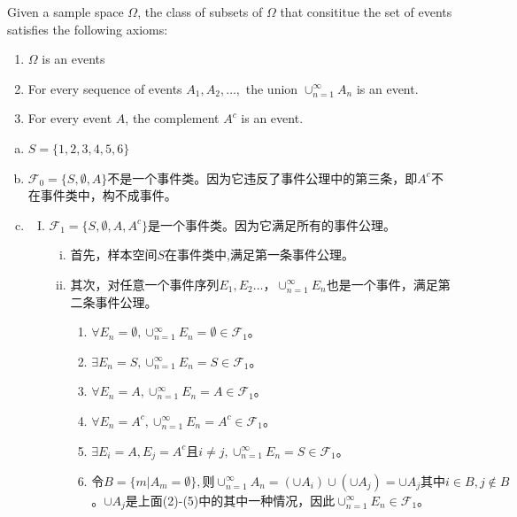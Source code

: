 \documentclass[UTF8]{article}
\begin{document}
Given a sample space $\Omega$, the class of subsets of $\Omega$ that consititue the set of events satisfies the following axioms:
\begin{enumerate}
    \item $\Omega$ is an events
    \item For every sequence of events $A_1,A_2,\dots,$ the union $\cup^\infty_{n=1}A_n$ is an event.
    \item For every event $A$, the complement $A^c$ is an event.
\end{enumerate}
\begin{enumerate}[a)]
    \item $S=\{1, 2, 3, 4, 5, 6\}$
    \item $\mathcal{F}_0=\{S,\emptyset,A\}$不是一个事件类。因为它违反了事件公理中的第三条，即$A^c$不在事件类中，构不成事件。
    \item   \begin{enumerate}[I.]
                \item $\mathcal{F}_1=\{S,\emptyset, A, A^c\}$是一个事件类。因为它满足所有的事件公理。
                \begin{enumerate}[i.]
                    \item 首先，样本空间$S$在事件类中,满足第一条事件公理。
                    \item 其次，对任意一个事件序列$E_1,E_2\dots$，$\cup^\infty_{n=1}E_n$也是一个事件，满足第二条事件公理。
                        \begin{enumerate}[(1)]
                            \item $\forall E_n=\emptyset, \cup^\infty_{n=1}E_n=\emptyset\in\mathcal{F}_1$。
                            \item $\exists E_n=S, \cup^\infty_{n=1}E_n=S\in\mathcal{F}_1$。
                            \item $\forall E_n=A, \cup^\infty_{n=1}E_n=A\in\mathcal{F}_1$。
                            \item $\forall E_n=A^c, \cup^\infty_{n=1}E_n=A^c\in\mathcal{F}_1$。
                            \item $\exists E_i=A, E_j=A^c\text{且}i\neq j, \cup^\infty_{n=1}E_n=S\in\mathcal{F}_1$。
                            \item $令B=\{m|A_m=\emptyset\},\text{则}\cup^\infty_{n=1}A_n=(\cup A_i)\cup(\cup A_j)=\cup A_j\text{其中}i\in B, j\notin B$。$\cup A_j$是上面(2)-(5)中的其中一种情况，因此$\cup^\infty_{n=1}E_n\in\mathcal{F}_1$。
                        \end{enumerate}

\end{enumerate}
\end{enumerate}
\end{enumerate}
\end{document}
